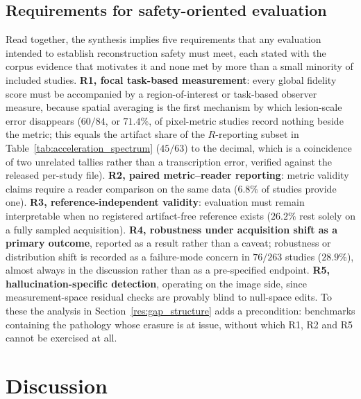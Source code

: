 \documentclass[review,authoryear]{elsarticle}
\begin{document}
\subsection{Requirements for safety-oriented evaluation}
\label{sec:requirements}
Read together, the synthesis implies five requirements that any evaluation intended to
establish reconstruction safety must meet, each stated with the corpus evidence that
motivates it and none met by more than a small minority of included studies.
\textbf{R1, focal task-based measurement}: every global fidelity score must be
accompanied by a region-of-interest or task-based observer measure, because spatial
averaging is the first mechanism by which lesion-scale error disappears ($60/84$, or
$71.4\%$, of pixel-metric studies record nothing beside the metric; this equals the
artifact share of the $R$-reporting subset in Table~\ref{tab:acceleration_spectrum}
($45/63$) to the decimal, which is a coincidence of two unrelated tallies rather than a
transcription error, verified against the released per-study file). \textbf{R2, paired
metric--reader reporting}: metric validity claims require a reader comparison on the
same data ($6.8\%$ of studies provide one). \textbf{R3, reference-independent validity}:
evaluation must remain interpretable when no registered artifact-free reference exists
($26.2\%$ rest solely on a fully sampled acquisition). \textbf{R4, robustness
under acquisition shift as a primary outcome}, reported as a result rather than a
caveat; robustness or distribution shift is recorded as a failure-mode concern in
$76/263$ studies ($28.9\%$), almost always in the discussion rather than as a
pre-specified endpoint.
\textbf{R5, hallucination-specific detection}, operating on the image side, since
measurement-space residual checks are provably blind to null-space edits. To these the
analysis in Section~\ref{res:gap_structure} adds a precondition: benchmarks containing
the pathology whose erasure is at issue, without which R1, R2 and R5 cannot be
exercised at all.

\section{Discussion}
\label{sec:discussion}
\end{document}
